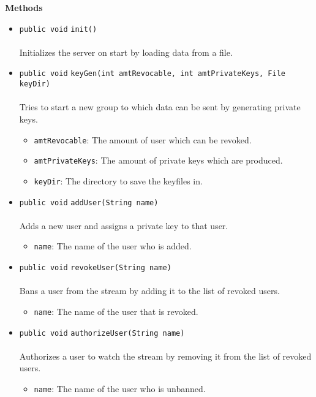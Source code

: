 \textbf{\sffamily Methods}
\begin{itemize}
\item \lstinline|public void| \lstinline|init|\lstinline|()|\\ \\[-0.6em]
Initializes the server on start by loading data from a file.



\item \lstinline|public void| \lstinline|keyGen|\lstinline|(int amtRevocable, int amtPrivateKeys, File keyDir)|\\ \\[-0.6em]
Tries to start a new group to which data can be sent by generating private keys.
\begin{itemize}
\item \lstinline|amtRevocable|: The amount of user which can be revoked.
\item \lstinline|amtPrivateKeys|: The amount of private keys which are produced.
\item \lstinline|keyDir|: The directory to save the keyfiles in.
\end{itemize}



\item \lstinline|public void| \lstinline|addUser|\lstinline|(String name)|\\ \\[-0.6em]
Adds a new user and assigns a private key to that user.
\begin{itemize}
\item \lstinline|name|: The name of the user who is added.
\end{itemize}



\item \lstinline|public void| \lstinline|revokeUser|\lstinline|(String name)|\\ \\[-0.6em]
Bans a user from the stream by adding it to the list of revoked users.
\begin{itemize}
\item \lstinline|name|: The name of the user that is revoked.
\end{itemize}



\item \lstinline|public void| \lstinline|authorizeUser|\lstinline|(String name)|\\ \\[-0.6em]
Authorizes a user to watch the stream by removing it from the list of revoked users.
\begin{itemize}
\item \lstinline|name|: The name of the user who is unbanned.
\end{itemize}




\end{itemize}
